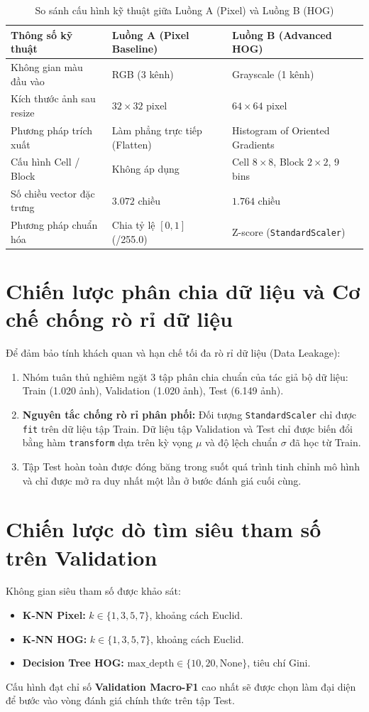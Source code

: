 \documentclass[../DoAn.tex]{subfiles}
\begin{document}
\begin{table}[H]
\centering
\caption{So sánh cấu hình kỹ thuật giữa Luồng A (Pixel) và Luồng B (HOG)}
\label{tab:pipeline_comparison}
\begin{tabular}{@{}p{3.8cm} p{4.8cm} p{5.4cm}@{}}
\hline
\textbf{Thông số kỹ thuật} & \textbf{Luồng A (Pixel Baseline)} & \textbf{Luồng B (Advanced HOG)} \\ \hline
Không gian màu đầu vào & RGB (3 kênh) & Grayscale (1 kênh) \\
Kích thước ảnh sau resize & $32 \times 32$ pixel & $64 \times 64$ pixel \\
Phương pháp trích xuất & Làm phẳng trực tiếp (Flatten) & Histogram of Oriented Gradients \\
Cấu hình Cell / Block & Không áp dụng & Cell $8\times8$, Block $2\times2$, 9 bins \\
Số chiều vector đặc trưng & $3.072$ chiều & $1.764$ chiều \\
Phương pháp chuẩn hóa & Chia tỷ lệ $[0, 1]$ (/255.0) & Z-score (\texttt{StandardScaler}) \\ \hline
\end{tabular}
\end{table}

\section{Chiến lược phân chia dữ liệu và Cơ chế chống rò rỉ dữ liệu}
Để đảm bảo tính khách quan và hạn chế tối đa rò rỉ dữ liệu (Data Leakage):
\begin{enumerate}
    \item Nhóm tuân thủ nghiêm ngặt 3 tập phân chia chuẩn của tác giả bộ dữ liệu: Train (1.020 ảnh), Validation (1.020 ảnh), Test (6.149 ảnh).
    \item \textbf{Nguyên tắc chống rò rỉ phân phối:} Đối tượng \texttt{StandardScaler} chỉ được \texttt{fit} trên dữ liệu tập Train. Dữ liệu tập Validation và Test chỉ được biến đổi bằng hàm \texttt{transform} dựa trên kỳ vọng $\mu$ và độ lệch chuẩn $\sigma$ đã học từ Train.
    \item Tập Test hoàn toàn được đóng băng trong suốt quá trình tinh chỉnh mô hình và chỉ được mở ra duy nhất một lần ở bước đánh giá cuối cùng.
\end{enumerate}

\section{Chiến lược dò tìm siêu tham số trên Validation}
Không gian siêu tham số được khảo sát:
\begin{itemize}
    \item \textbf{K-NN Pixel:} $k \in \{1, 3, 5, 7\}$, khoảng cách Euclid.
    \item \textbf{K-NN HOG:} $k \in \{1, 3, 5, 7\}$, khoảng cách Euclid.
    \item \textbf{Decision Tree HOG:} $\text{max\_depth} \in \{10, 20, \text{None}\}$, tiêu chí Gini.
\end{itemize}
Cấu hình đạt chỉ số \textbf{Validation Macro-F1} cao nhất sẽ được chọn làm đại diện để bước vào vòng đánh giá chính thức trên tập Test.
\end{document}
